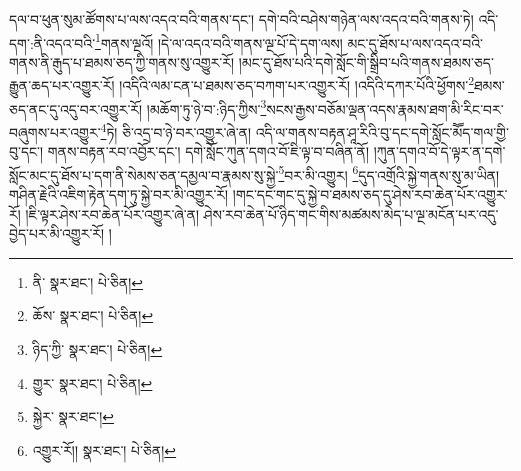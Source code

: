 དལ་བ་ཕུན་སུམ་ཚོགས་པ་ལས་འདའ་བའི་གནས་དང་། དགེ་བའི་བཤེས་གཉེན་ལས་འདའ་བའི་གནས་ཏེ། འདི་དག་:ནི་འདའ་བའི་\footnote{ནི་  སྣར་ཐང་།  པེ་ཅིན། }གནས་ལྔའོ། །དེ་ལ་འདའ་བའི་གནས་ལྔ་པོ་དེ་དག་ལས། མང་དུ་ཐོས་པ་ལས་འདའ་བའི་གནས་ནི་རྒུད་པ་ཐམས་ཅད་ཀྱི་གནས་སུ་འགྱུར་རོ། །མང་དུ་ཐོས་པའི་དགེ་སློང་གི་སྒྲིབ་པའི་གནས་ཐམས་ཅད་རྒྱུན་ཆད་པར་འགྱུར་རོ། །འདིའི་ལམ་ངན་པ་ཐམས་ཅད་བཀག་པར་འགྱུར་རོ། །འདིའི་དཀར་པོའི་ཕྱོགས་\footnote{ཆོས་  སྣར་ཐང་།  པེ་ཅིན། }ཐམས་ཅད་ནང་དུ་འདུ་བར་འགྱུར་རོ། །མཆོག་ཏུ་ཉེ་བ་:ཉིད་ཀྱིས་\footnote{ཉིད་ཀྱི་  སྣར་ཐང་།  པེ་ཅིན། }སངས་རྒྱས་བཅོམ་ལྡན་འདས་རྣམས་ཐག་མི་རིང་བར་བཞུགས་པར་འགྱུར་\footnote{གྱུར་  སྣར་ཐང་།  པེ་ཅིན། }ཏེ། ཅི་འདྲ་བ་ཉེ་བར་འགྱུར་ཞེ་ན། འདི་ལ་གནས་བརྟན་ཤཱ་རིའི་བུ་དང་དགེ་སློང་མཽད་གལ་གྱི་བུ་དང་། གནས་བརྟན་རབ་འབྱོར་དང་། དགེ་སློང་ཀུན་དགའ་བོ་ཇི་ལྟ་བ་བཞིན་ནོ། །ཀུན་དགའ་བོ་དེ་ལྟར་ན་དགེ་སློང་མང་དུ་ཐོས་པ་དག་ནི་སེམས་ཅན་དམྱལ་བ་རྣམས་སུ་སྐྱེ་\footnote{སྐྱེར་  སྣར་ཐང་། }བར་མི་འགྱུར། \footnote{འགྱུར་རོ།།   སྣར་ཐང་།  པེ་ཅིན། }དུད་འགྲོའི་སྐྱེ་གནས་སུ་མ་ཡིན། གཤིན་རྗེའི་འཇིག་རྟེན་དག་ཏུ་སྐྱེ་བར་མི་འགྱུར་རོ། །གང་དང་གང་དུ་སྐྱེ་བ་ཐམས་ཅད་དུ་ཤེས་རབ་ཆེན་པོར་འགྱུར་རོ། །ཇི་ལྟར་ཤེས་རབ་ཆེན་པོར་འགྱུར་ཞེ་ན། ཤེས་རབ་ཆེན་པོ་ཉིད་གང་གིས་མཚམས་མེད་པ་ལྔ་མངོན་པར་འདུ་བྱེད་པར་མི་འགྱུར་རོ། །
